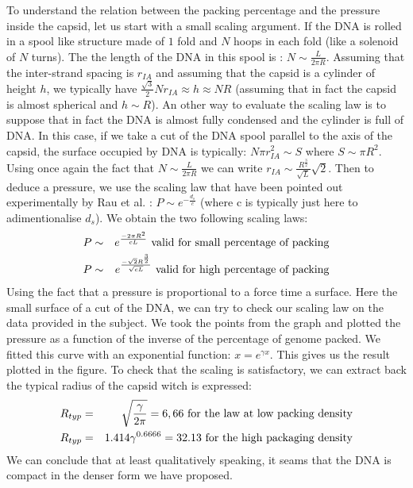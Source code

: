 \documentclass{article}
\begin{document}
To understand the relation between the packing percentage and the pressure inside the capsid, let us start with a small scaling argument. If the DNA is rolled in a spool like structure made of $1$ fold and $N$ hoops in each fold (like a solenoid of $N$ turns). The the length of the DNA in this spool is : $N \sim \frac{L}{2 \pi R}$. Assuming that the inter-strand spacing is $r_{IA}$ and assuming that the capsid is a cylinder of height $h$, we typically have $\frac{\sqrt{3}}{2} N r_{IA} \approx h \approx NR$ (assuming that in fact the capsid is almost spherical and $h \sim R$).
An other way to evaluate the scaling law is to suppose that in fact the DNA is almost fully condensed and the cylinder is full of DNA. In this case, if we take a cut of the DNA spool parallel to the axis of the capsid, the surface occupied by DNA is typically: $N \pi r^2_{IA} \sim S$ where $S \sim \pi R^2$. Using once again the fact that $N \sim \frac{L}{2 \pi R}$ we can write $r_{IA} \sim \frac{R^{\frac{3}{2}}}{\sqrt{L}}\sqrt{2}$.
Then to deduce a pressure, we use the scaling law that have been pointed out experimentally by Rau et al. \cite{rau1992}: $P \sim e^{-\frac{d_s}{c}}$ (where c is typically just here to adimentionalise $d_s$). We obtain the two following scaling laws:
\begin{eqnarray}
    P &\sim& e^{\frac{- 2 \pi R^2}{cL}} \textnormal{ valid for small percentage of packing}\\
    P & \sim & e^{\frac{- \sqrt{2} R^{\frac{3}{2}}}{\sqrt{cL}}} \textnormal{ valid for high percentage of packing} 
\end{eqnarray}
Using the fact that a pressure is proportional to a force time a surface. Here the small surface of a cut of the DNA, we can try to check our scaling law on the data provided in the subject. We took the points from the graph and plotted the pressure as a function of the inverse of the percentage of genome packed. We fitted this curve with an exponential function: $x = e^{\gamma x}$. This gives us the result plotted in the figure. To check that the scaling is satisfactory, we can extract back the typical radius of the capsid witch is expressed:
\begin{eqnarray}
    R_{typ} & = &  \sqrt{\frac{\gamma}{2 \pi}} = 6,66 \textnormal{ for the law at low packing density}\\
    R_{typ} & = & 1.414 \gamma^{0.6666} = 32.13 \textnormal{ for the high packaging density}
\end{eqnarray}
We can conclude that at least qualitatively speaking, it seams that the DNA is compact in the denser form we have proposed.
\end{document}
